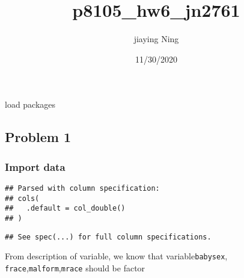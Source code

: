 \documentclass[]{article}
\title{p8105\_hw6\_jn2761}
\author{jiaying Ning}
\date{11/30/2020}
\newenvironment{Shaded}{\begin{snugshade}}{\end{snugshade}}
\newcommand{\KeywordTok}[1]{\textcolor[rgb]{0.13,0.29,0.53}{\textbf{#1}}}
\newcommand{\NormalTok}[1]{#1}
\newcommand{\OperatorTok}[1]{\textcolor[rgb]{0.81,0.36,0.00}{\textbf{#1}}}
\newcommand{\StringTok}[1]{\textcolor[rgb]{0.31,0.60,0.02}{#1}}
\begin{document}
\maketitle

load packages

\hypertarget{problem-1}{%
\subsection{Problem 1}\label{problem-1}}

\hypertarget{import-data}{%
\subsubsection{Import data}\label{import-data}}

\begin{Shaded}
\end{Shaded}

\begin{verbatim}
## Parsed with column specification:
## cols(
##   .default = col_double()
## )
\end{verbatim}

\begin{verbatim}
## See spec(...) for full column specifications.
\end{verbatim}

From description of variable, we know that variable\texttt{babysex},
\texttt{frace},\texttt{malform},\texttt{mrace} should be factor
\end{document}
